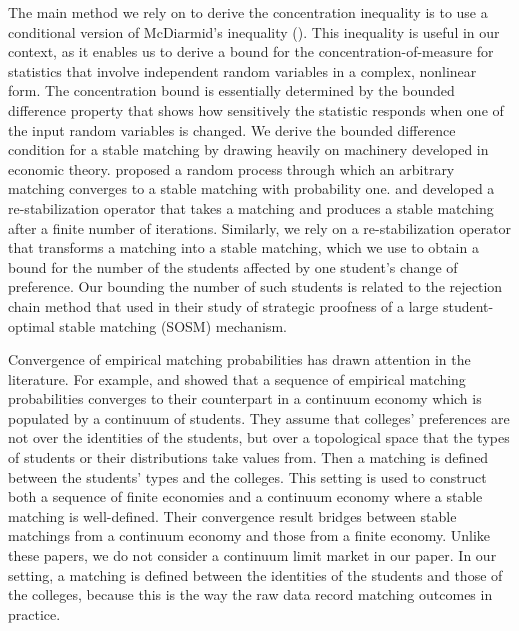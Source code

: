\documentclass[12pt, fullpage]{amsart}
\theoremstyle{definition}
\theoremstyle{definition}
\theoremstyle{definition}
\begin{document}
\begin{bibunit}[econometrica]
    The main method we rely on to derive the concentration inequality is to use a conditional version of McDiarmid's inequality (\cite{McDiarmid:1989:SurveysinCombinatorics}). This inequality is useful in our context, as it enables us to derive a bound for the concentration-of-measure for statistics that involve independent random variables in a complex, nonlinear form. The concentration bound is essentially determined by the bounded difference property that shows how sensitively the statistic responds when one of the input random variables is changed.  We derive the bounded difference condition for a stable matching by drawing heavily on machinery developed in economic theory. \cite{Roth/Vandevate:1990:Ecta} proposed a random process through which an arbitrary matching converges to a stable matching with probability one. \cite{Blum/Roth/Rothblum:1997:JET} and \cite{Blum/Rothblum/2002} developed a re-stabilization operator that takes a matching and produces a stable matching after a finite number of iterations. Similarly, we rely on a re-stabilization operator that transforms a matching into a stable matching, which we use to obtain a bound for the number of the students affected by one student's change of preference. Our bounding the number of such students is related to the rejection chain method that \cite{Kojima/Pathak:09:AER} used in their study of strategic proofness of a large student-optimal stable matching (SOSM) mechanism.
    
    Convergence of empirical matching probabilities has drawn attention in the literature. For example, \cite{Azevedo/Leshno:2016:JPE} and \cite{Che/Kim/Kojima:2019:ECA} showed that a sequence of empirical matching probabilities converges to their counterpart in a continuum economy which is populated by a continuum of students. They assume that colleges' preferences are not over the identities of the students, but over a topological space that the types of students or their distributions take values from. Then a matching is defined between the students' types and the colleges. This setting is used to construct both a sequence of finite economies and a continuum economy where a stable matching is well-defined. Their convergence result bridges between stable matchings from a continuum economy and those from a finite economy. Unlike these papers, we do not consider a continuum limit market in our paper. In our setting, a matching is defined between the identities of the students and those of the colleges, because this is the way the raw data record matching outcomes in practice.
    

\end{bibunit}
\end{document}
